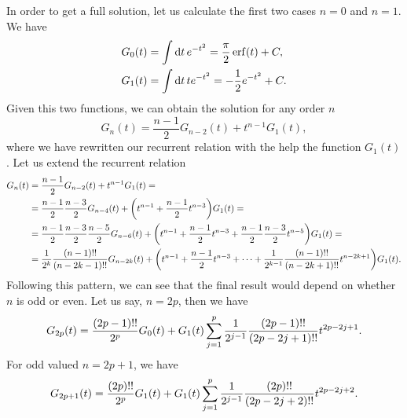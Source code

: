 \documentclass[aps,prl,preprint,groupedaddress,10pt]{revtex4-2}
\begin{document}
In order to get a full solution, let us calculate the first two cases $n=0$ and $n=1$.
We have
\begin{equation}
    \begin{split}
        G_0(t)&=\int\dd{t}e^{-t^2}=\frac{\pi}{2}\erf(t)+C,\\
        G_1(t)&=\int\dd{t}te^{-t^2}=-\frac{1}{2}e^{-t^2}+C.
    \end{split}
\end{equation}
Given this two functions, we can obtain the solution for any order $n$
\begin{equation}
    G_n(t)=\frac{n-1}{2}G_{n-2}(t)+t^{n-1}G_1(t),
\end{equation}
where we have rewritten our recurrent relation with the help the function $G_1(t)$.
Let us extend the recurrent relation
\begin{equation}
    \begin{split}
        G_n(t)&=\frac{n-1}{2}G_{n-2}(t)+t^{n-1}G_1(t)=\\
        &=\frac{n-1}{2}\frac{n-3}{2}G_{n-4}(t)+\pqty{t^{n-1}+\frac{n-1}{2}t^{n-3}}G_1(t)=\\
        &=\frac{n-1}{2}\frac{n-3}{2}\frac{n-5}{2}G_{n-6}(t)
        +\pqty{t^{n-1}+\frac{n-1}{2}t^{n-3}+\frac{n-1}{2}\frac{n-3}{2}t^{n-5}}G_1(t)=\\
        &=\frac{1}{2^k}\frac{\pqty{n-1}!!}{\pqty{n-2k-1}!!}G_{n-2k}(t)+
        \pqty{t^{n-1}+\frac{n-1}{2}t^{n-3}+\cdots+\frac{1}{2^{k-1}}
        \frac{\pqty{n-1}!!}{\pqty{n-2k+1}!!}t^{n-2k+1}}G_1(t).
    \end{split}
\end{equation}
Following this pattern, we can see that the final result would depend on whether $n$ is
odd or even. Let us say, $n=2p$, then we have
\begin{equation}
    G_{2p}(t)=\frac{\pqty{2p-1}!!}{2^p}G_0(t)+G_1(t)\sum_{j=1}^{p}
    \frac{1}{2^{j-1}}\frac{\pqty{2p-1}!!}{\pqty{2p-2j+1}!!}t^{2p-2j+1}.
\end{equation}
For odd valued $n=2p+1$, we have
\begin{equation}
    G_{2p+1}(t)=\frac{\pqty{2p}!!}{2^p}G_1(t)+G_1(t)\sum_{j=1}^{p}
    \frac{1}{2^{j-1}}\frac{\pqty{2p}!!}{\pqty{2p-2j+2}!!}t^{2p-2j+2}.
\end{equation}
\end{document}
